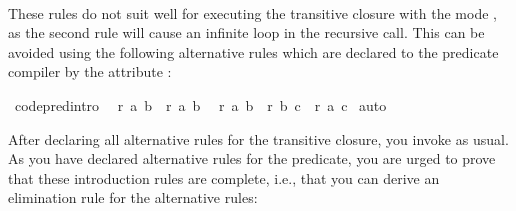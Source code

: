 \begin{isabellebody}
%
\endisadelimquote
%
\isatagquote
%
\begin{isamarkuptext}%
 \\
\end{isamarkuptext}%
\isamarkuptrue%
%
\endisatagquote
{\isafoldquote}%
%
\isadelimquote
%
\endisadelimquote
%
\begin{isamarkuptext}%
\noindent These rules do not suit well for executing the transitive
  closure with the mode , as
  the second rule will cause an infinite loop in the recursive call.
  This can be avoided using the following alternative rules which are
  declared to the predicate compiler by the attribute \hyperlink{attribute.code-pred-intro}{\mbox{}}:%
\end{isamarkuptext}%
\isamarkuptrue%
%
\isadelimquote
%
\endisadelimquote
%
\isatagquote
{}\isamarkupfalse%
\ {\isacharbrackleft}code{\isacharunderscore}pred{\isacharunderscore}intro{\isacharbrackright}{\isacharcolon}\isanewline
\ \ {\isachardoublequoteopen}r\ a\ b\ {\isasymLongrightarrow}\ r\isactrlsup {\isacharplus}\isactrlsup {\isacharplus}\ a\ b{\isachardoublequoteclose}\isanewline
\ \ {\isachardoublequoteopen}r\ a\ b\ {\isasymLongrightarrow}\ r\isactrlsup {\isacharplus}\isactrlsup {\isacharplus}\ b\ c\ {\isasymLongrightarrow}\ r\isactrlsup {\isacharplus}\isactrlsup {\isacharplus}\ a\ c{\isachardoublequoteclose}\isanewline
{}\isamarkupfalse%
\ auto%
\endisatagquote
{\isafoldquote}%
%
\isadelimquote
%
\endisadelimquote
%
\begin{isamarkuptext}%
\noindent After declaring all alternative rules for the transitive
  closure, you invoke \hyperlink{command.code-pred}{\mbox{}} as usual.  As you have
  declared alternative rules for the predicate, you are urged to prove
  that these introduction rules are complete, i.e., that you can
  derive an elimination rule for the alternative rules:%
\end{isamarkuptext}%
\isamarkuptrue%
%
\isadelimquote
%
\endisadelimquote
%
\isatagquote

\end{isabellebody}
